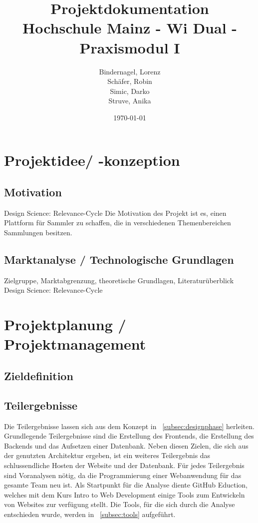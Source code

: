 \documentclass[a4paper, 12pt]{article}
\title{
    Projektdokumentation\\
    Hochschule Mainz - Wi Dual - Praxismodul I
}
\author{
    Bindernagel, Lorenz\\
    Schäfer, Robin\\
    Simic, Darko\\
    Struve, Anika
}
\date{
    \today
}
\begin{document}
    \maketitle
    \tableofcontents
    \newpage

    \onehalfspacing

    \section{Projektidee/ -konzeption}
    
    \subsection{Motivation}
    Design Science: Relevance-Cycle
    Die Motivation des Projekt ist es, einen Plattform für Sammler zu schaffen, die in verschiedenen Themenbereichen Sammlungen besitzen.


    \subsection{Marktanalyse / Technologische Grundlagen}
    Zielgruppe, Marktabgrenzung, theoretische Grundlagen, Literaturüberblick\linebreak
    Design Science: Relevance-Cycle

    \newpage

    \section{Projektplanung / Projektmanagement}
    
    \subsection{Zieldefinition}

    \subsection{Teilergebnisse}
    Die Teilergebnisse lassen sich aus dem Konzept in ~\ref{subsec:designphase} herleiten.
    Grundlegende Teilergebnisse sind die Erstellung des Frontends, die Erstellung des Backends und das Aufsetzen einer Datenbank.
    Neben diesen Zielen, die sich aus der genutzten Architektur ergeben, ist ein weiteres Teilergebnis das schlussendliche Hosten der Website und der Datenbank.
    Für jedes Teilergebnis sind Voranalysen nötig, da die Programmierung einer Webanwendung für das gesamte Team neu ist.
    Als Startpunkt für die Analyse diente GitHub Eduction, welches mit dem Kurs Intro to Web Development einige Tools zum Entwickeln von Websites zur verfügung stellt.
    Die Tools, für die sich durch die Analyse entschieden wurde, werden in ~\ref{subsec:tools} aufgeführt.
\end{document}
